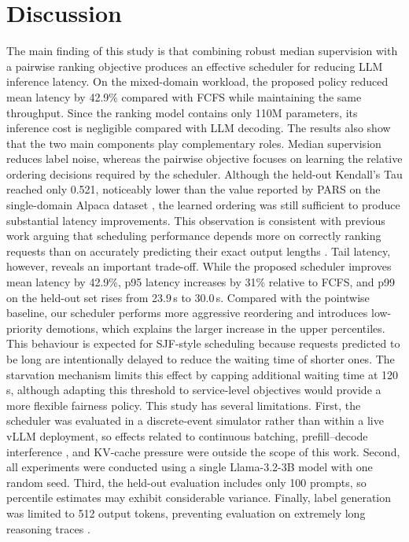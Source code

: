 \documentclass[conference]{IEEEtran}
\begin{document}
\section{Discussion}
The main finding of this study is that combining robust median supervision with a pairwise ranking objective produces an effective scheduler for reducing LLM inference latency. On the mixed-domain workload, the proposed policy reduced mean latency by 42.9\% compared with FCFS while maintaining the same throughput. Since the ranking model contains only 110M parameters, its inference cost is negligible compared with LLM decoding. The results also show that the two main components play complementary roles. Median supervision reduces label noise, whereas the pairwise objective focuses on learning the relative ordering decisions required by the scheduler. Although the held-out Kendall's Tau reached only 0.521, noticeably lower than the value reported by PARS on the single-domain Alpaca dataset \cite{tao2025pars}, the learned ordering was still sufficient to produce substantial latency improvements. This observation is consistent with previous work arguing that scheduling performance depends more on correctly ranking requests than on accurately predicting their exact output lengths \cite{fu2024efficient}.
Tail latency, however, reveals an important trade-off. While the proposed scheduler improves mean latency by 42.9\%, p95 latency increases by 31\% relative to FCFS, and p99 on the held-out set rises from 23.9\,s to 30.0\,s. Compared with the pointwise baseline, our scheduler performs more aggressive reordering and introduces low-priority demotions, which explains the larger increase in the upper percentiles. This behaviour is expected for SJF-style scheduling because requests predicted to be long are intentionally delayed to reduce the waiting time of shorter ones. The starvation mechanism limits this effect by capping additional waiting time at 120\,s, although adapting this threshold to service-level objectives would provide a more flexible fairness policy.
This study has several limitations. First, the scheduler was evaluated in a discrete-event simulator rather than within a live vLLM deployment, so effects related to continuous batching, prefill--decode interference \cite{agrawal2024sarathi}, and KV-cache pressure \cite{kwon2023pagedattention} were outside the scope of this work. Second, all experiments were conducted using a single Llama-3.2-3B model with one random seed. Third, the held-out evaluation includes only 100 prompts, so percentile estimates may exhibit considerable variance. Finally, label generation was limited to 512 output tokens, preventing evaluation on extremely long reasoning traces \cite{guo2025deepseekr1}.
\end{document}
